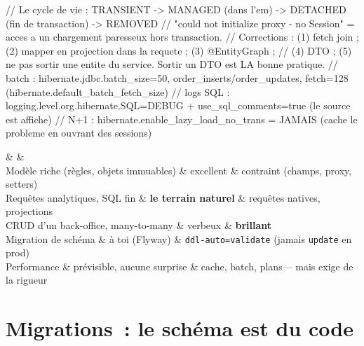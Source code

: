 \begin{codejava}
// Le cycle de vie : TRANSIENT -> MANAGED (dans l'em) -> DETACHED (fin de transaction) -> REMOVED
// "could not initialize proxy - no Session" = acces a un chargement paresseux hors transaction.
// Corrections : (1) fetch join ; (2) mapper en projection dans la requete ; (3) @EntityGraph ;
// (4) DTO ; (5) ne pas sortir une entite du service. Sortir un DTO est LA bonne pratique.
// batch : hibernate.jdbc.batch_size=50, order_inserts/order_updates, fetch=128 (hibernate.default_batch_fetch_size)
// logs SQL : logging.level.org.hibernate.SQL=DEBUG + use_sql_comments=true (le source est affiche)
// N+1 : hibernate.enable_lazy_load_no_trans = JAMAIS (cache le probleme en ouvrant des sessions)
\end{codejava}

\begin{tablez}
  \headrow \&  \&  \\
  \midrule
  Mod\`ele riche (r\`egles, objets immuables) \& excellent \& contraint (champs, proxy, setters) \\
  Requ\^etes analytiques, SQL fin \& \textbf{le terrain naturel} \& requ\^etes natives, projections \\
  CRUD d'un back-office, many-to-many \& verbeux \& \textbf{brillant} \\
  Migration de sch\'ema \& \`a toi (Flyway) \& \verb|ddl-auto=validate| (jamais \verb|update| en prod) \\
  Performance \& pr\'evisible, aucune surprise \& cache, batch, plans--- mais exige de la rigueur \\
\end{tablez}

\section{Migrations~: le sch\'ema est du code}


